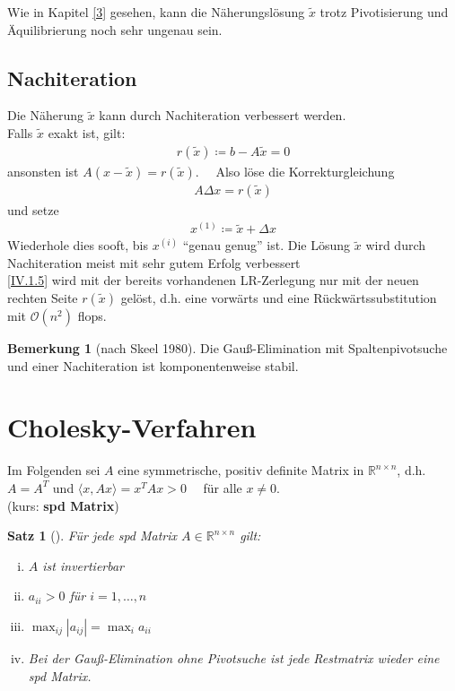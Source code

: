 \documentclass[ngerman,fontsize=11pt, paper=a4, parskip=half, titlepage=true, toc=bib]{scrbook}
\theoremstyle{definition}
\newtheorem{Bem}[Def]{Bemerkung}	%
\theoremstyle{plain}
\newtheorem{Satz}[Def]{Satz}		%
\newcommand{\Renn}{\mathds{R}^{n\times n}}
\newcommand{\sectione}[1]{\section{#1} \setcounter{equation}{0}}
\newcommand{\subsectione}[1]{\subsection{#1} \addtocounter{Def}{1}}
\newenvironment{Satze}[1][]{ %
	\begin{Satz}[#1]
}
{
	\end{Satz}
	\addtocounter{subsection}{1}
}
\newenvironment{Beme}[1][]{ %
	\begin{Bem}[#1]
	}
	{
	\end{Bem}
	\addtocounter{subsection}{1}
}
\begin{document}
  Wie in Kapitel \ref{3} gesehen, kann die Näherungslösung $\widetilde{x}$ 
  trotz Pivotisierung und Äquilibrierung noch sehr ungenau sein.


  \subsectione{Nachiteration} 
  Die Näherung $\widetilde{x}$ kann durch Nachiteration verbessert werden. \\
  Falls $\widetilde{x}$ exakt ist, gilt:
  \begin{gather}
    r(\widetilde{x}) \coloneqq b-A\widetilde{x} =0 \label{IV.1.4}
  \end{gather}
  ansonsten ist $A(x-\widetilde{x})=r(\widetilde{x}).$ \ \
  Also löse die Korrekturgleichung
  \begin{gather}
    A\Delta x = r(\widetilde{x}) 	\label{IV.1.5}
  \end{gather}
  und setze
  \begin{gather*}
    x^{(1)} \coloneqq \widetilde{x} +\Delta x
  \end{gather*}
  Wiederhole dies sooft, bis $x^{(i)}$ \enquote{genau genug} ist.
  Die Lösung $\widetilde{x}$ wird durch Nachiteration meist mit sehr gutem Erfolg verbessert
  \cite[genaueres in ][]{dahmenreusken}\\
  \eqref{IV.1.5} wird mit der bereits vorhandenen LR-Zerlegung
  nur mit der neuen rechten Seite $r(\widetilde{x})$ gelöst, 
  d.h. eine vorwärts und eine Rückwärtssubstitution
  mit $\mathcal{O}(n^2)$ flops.

\begin{Beme}[nach Skeel 1980]
	Die Gauß-Elimination mit Spaltenpivotsuche und einer Nachiteration
	ist komponentenweise stabil.
\end{Beme}
  

  \sectione{Cholesky-Verfahren}
  Im Folgenden sei $A$ eine symmetrische, positiv definite Matrix in $\Renn $, d.h.
  $A=A^T$ und $\langle x, Ax \rangle = x^TAx > 0 \quad $ für alle $ x\neq 0$. \\
  (kurs: \textbf{spd Matrix}) \index{spd Matrix}

  \begin{Satze}
  	\label{4.2.1}
  	Für jede spd Matrix $A\in \Renn $ gilt:
  	\begin{enumerate}[i)]	
  		\item $A$ ist invertierbar
  		\item $a_{ii}>0$ für $i=1, \dots , n$
  		\item $\max_{ij}|a_{ij}| = \max_{i}a_{ii}$
  		\item Bei der Gauß-Elimination ohne Pivotsuche ist jede Restmatrix wieder eine spd Matrix.
  	\end{enumerate}
  \end{Satze}
    	
\end{document}
